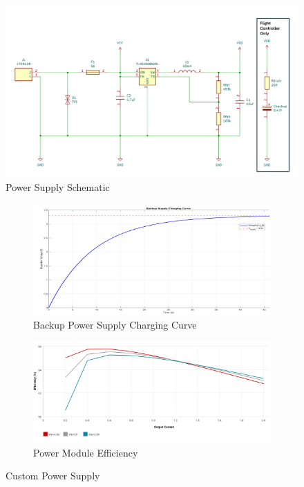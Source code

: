 \begin{figure}[htbp]
  \centering
  \includegraphics[width=\textwidth]{figs/Thomas/Custom Hardware/Power Supply.png}
  \caption{Power Supply Schematic}
  \label{fig:power_supply_schematic}
\end{figure}



\begin{figure}[htbp]
  \centering
  \begin{subfigure}[b]{0.48\textwidth}
    \includegraphics[width=\textwidth]{figs/Thomas/Custom Hardware/charging_curve.png}
    \caption{Backup Power Supply Charging Curve}
    \label{fig:charging_curve}
  \end{subfigure}
  \hfill
  \begin{subfigure}[b]{0.48\textwidth}
    \includegraphics[width=\textwidth]{figs/Thomas/Custom Hardware/Power Module Effciency.png}
    \caption{Power Module Efficiency}
    \label{fig:power_efficiency}
  \end{subfigure}
  \caption{Custom Power Supply}
  \label{fig:power_graphs}
\end{figure}
